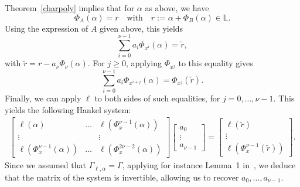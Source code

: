 \documentclass[sigconf]{acmart}
\renewcommand{\L}{\mathbb{L}}
\begin{document}
Theorem~\ref{charpoly} implies that for $\alpha$ as above, we have
\[\Phi_A(\alpha)=r \quad\text{with}\quad r:=\alpha + \Phi_B(\alpha) \in \L.\]
Using the expression of $A$ given above, this yields
\[ \sum_{i = 0}^{\nu - 1}a_i \Phi_{x^{i}}(\alpha) = \tilde r,\]
with $\tilde r =  r-a_\nu \Phi_\nu(\alpha)$.
For $j \ge 0$, applying $\Phi_{x^j}$ to this equality
gives
\[ \sum_{i = 0}^{\nu - 1}a_i \Phi_{x^{i+j}}(\alpha) = \Phi_{x^j}(\tilde r).\]
Finally, we can apply $\ell$ to both sides of such equalities,
for $j=0,\dots,\nu-1$.
This yields the following Hankel system:
\begin{align}\label{eq:A}
  \begin{bmatrix}   \ell(\alpha) & \ldots & \ell(\Phi_x^{\nu-1}(\alpha)) \\
    \vdots & & \vdots  \\ 
  \ell(\Phi_x^{\nu-1}(\alpha)) &  \ldots & \ell(\Phi_x^{2\nu-2}(\alpha))
\end{bmatrix} 
\begin{bmatrix} a_0  \\ \vdots \\ a_{\nu-1} \end{bmatrix} 
= 
\begin{bmatrix} \ell(\tilde r) \\ \vdots \\   \ell(\Phi_x^{\nu-1}(\tilde r)) \end{bmatrix}. 
\end{align}
Since we assumed that $\Gamma_{\ell,\alpha}=\Gamma$, applying for
instance Lemma~1 in~\cite{Kaltofen:1991:PEP:113379.113396}, we deduce 
that the matrix of the system is invertible, allowing us to
recover $a_0,\dots,a_{\nu-1}$.
\end{document}
